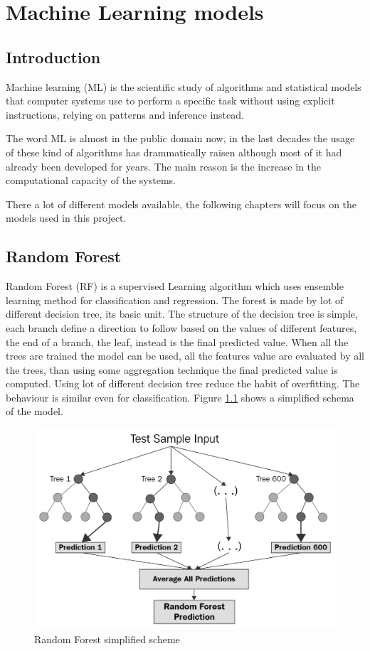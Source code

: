 \documentclass[%
    corpo=12pt,
    twoside,
    oldstyle,
    autoretitolo,
    greek,
    evenboxes,
]{toptesi}
\begin{document}

\chapter{Machine Learning models}

\section{Introduction}
Machine learning (ML) is the scientific study of algorithms and statistical models that computer systems use to perform a specific task without using explicit instructions, relying on patterns and inference instead.\cite{ml}

The word ML is almost in the public domain now, in the last decades the usage of these kind of algorithms has drammatically raisen although most of it had already been developed for years. The main reason is the increase in the computational capacity of the systems.

There a lot of different models available, the following chapters will focus on the models used in this project.

\section{Random Forest}
Random Forest (RF) is a supervised Learning algorithm which uses ensemble learning method for classification and regression. The forest is made by lot of different decision tree, its basic unit. The structure of the decision tree is simple, each branch define a direction to follow based on the values of different features, the end of a branch, the leaf, instead is the final predicted value. When all the trees are trained the model can be used, all the features value are evaluated by all the trees, than using some aggregation technique the final predicted value is computed. Using lot of different decision tree reduce the habit of overfitting. The behaviour is similar even for classification. Figure \ref{fig:rf} shows a simplified schema of the model.
\begin{figure}[!h]
  \includegraphics[width=\linewidth]{figure/rf.png}
  \caption{Random Forest simplified scheme \cite{rf}}
  \label{fig:rf}
\end{figure}
\end{document}
